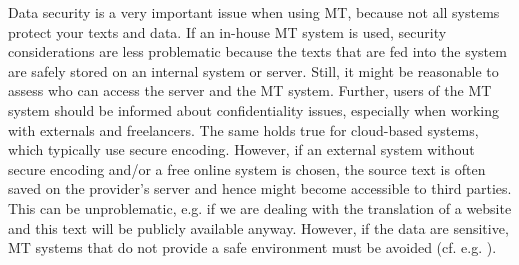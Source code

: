 Data security is a very important issue when using MT, because not all systems protect your texts and data. If an in-house MT system is used, security considerations are less problematic because the texts that are fed into the system are safely stored on an internal system or server. Still, it might be reasonable to assess who can access the server and the MT system. Further, users of the MT system should be informed about confidentiality issues, especially when working with externals and freelancers. The same holds true for cloud-based systems, which typically use secure encoding. However, if an external system without secure encoding and/or a free online system is chosen, the source text is often saved on the provider’s server and hence might become accessible to third parties. This can be unproblematic, e.g. if we are dealing with the translation of a website and this text will be publicly available anyway. However, if the data are sensitive, MT systems that do not provide a safe environment must be avoided (cf. e.g. \citealt{kamocki2015all}).


